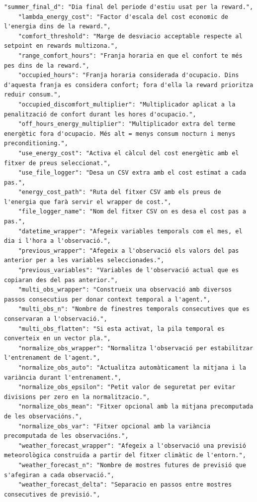 \documentclass[10pt,a4paper]{article}
\begin{document}
\begin{lstlisting}[style=studioPython,caption={backend/entrenar\_agent\_constants.py},label={lst:backend-entrenar-agent-constants-py}]
    "summer_final_d": "Dia final del periode d'estiu usat per la reward.",
    "lambda_energy_cost": "Factor d'escala del cost economic de l'energia dins de la reward.",
    "comfort_threshold": "Marge de desviacio acceptable respecte al setpoint en rewards multizona.",
    "range_comfort_hours": "Franja horaria en que el confort te més pes dins de la reward.",
    "occupied_hours": "Franja horaria considerada d'ocupacio. Dins d'aquesta franja es considera confort; fora d'ella la reward prioritza reduir consum.",
    "occupied_discomfort_multiplier": "Multiplicador aplicat a la penalització de confort durant les hores d'ocupacio.",
    "off_hours_energy_multiplier": "Multiplicador extra del terme energètic fora d'ocupacio. Més alt = menys consum nocturn i menys preconditioning.",
    "use_energy_cost": "Activa el càlcul del cost energètic amb el fitxer de preus seleccionat.",
    "use_file_logger": "Desa un CSV extra amb el cost estimat a cada pas.",
    "energy_cost_path": "Ruta del fitxer CSV amb els preus de l'energia que farà servir el wrapper de cost.",
    "file_logger_name": "Nom del fitxer CSV on es desa el cost pas a pas.",
    "datetime_wrapper": "Afegeix variables temporals com el mes, el dia i l'hora a l'observació.",
    "previous_wrapper": "Afegeix a l'observació els valors del pas anterior per a les variables seleccionades.",
    "previous_variables": "Variables de l'observació actual que es copiaran des del pas anterior.",
    "multi_obs_wrapper": "Construeix una observació amb diversos passos consecutius per donar context temporal a l'agent.",
    "multi_obs_n": "Nombre de finestres temporals consecutives que es conservaran a l'observació.",
    "multi_obs_flatten": "Si esta activat, la pila temporal es converteix en un vector pla.",
    "normalize_obs_wrapper": "Normalitza l'observació per estabilitzar l'entrenament de l'agent.",
    "normalize_obs_auto": "Actualitza automàticament la mitjana i la variància durant l'entrenament.",
    "normalize_obs_epsilon": "Petit valor de seguretat per evitar divisions per zero en la normalitzacio.",
    "normalize_obs_mean": "Fitxer opcional amb la mitjana precomputada de les observacións.",
    "normalize_obs_var": "Fitxer opcional amb la variància precomputada de les observacións.",
    "weather_forecast_wrapper": "Afegeix a l'observació una previsió meteorològica construida a partir del fitxer climàtic de l'entorn.",
    "weather_forecast_n": "Nombre de mostres futures de previsió que s'afegiran a cada observació.",
    "weather_forecast_delta": "Separacio en passos entre mostres consecutives de previsió.",

\end{lstlisting}
\end{document}
